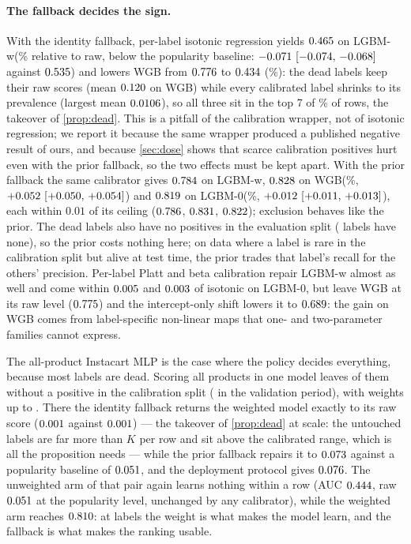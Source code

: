\documentclass[sigconf,nonacm]{acmart}
\newcommand{\Sm}{\textsf{LGBM-w}\xspace}
\newcommand{\Wm}{\textsf{WGB}\xspace}
\newcommand{\Nm}{\textsf{LGBM-0}\xspace}
\begin{document}
\paragraph{The fallback decides the sign.} With the identity fallback, per-label isotonic regression yields $0.465$ on \Sm (\nSplIsoIdRel\% relative to raw, below the popularity baseline: $-0.071~[-0.074,\,-0.068]$ against $0.535$) and lowers \Wm from $0.776$ to $0.434$ (\nWplIsoIdRel\%): the \nSnDead{} dead labels keep their raw scores (mean $0.120$ on \Wm) while every calibrated label shrinks to its prevalence (largest mean $0.0106$), so all three sit in the top 7 of \nWdeadAllRowsPct\% of rows, the takeover of \cref{prop:dead}. This is a pitfall of the calibration wrapper, not of isotonic regression; we report it because the same wrapper produced a published negative result of ours, and because \cref{sec:dose} shows that scarce calibration positives hurt even with the prior fallback, so the two effects must be kept apart. With the prior fallback the same calibrator gives $0.784$ on \Sm, $0.828$ on \Wm (\nWplIsoPriorRel\%, $+0.052~[+0.050,\,+0.054]$) and $0.819$ on \Nm (\nNplIsoPriorRel\%, $+0.012~[+0.011,\,+0.013]$), each within $0.01$ of its ceiling ($0.786$, $0.831$, $0.822$); exclusion behaves like the prior. The \nSnDead{} dead labels also have no positives in the evaluation split (\nnDeadTest{} labels have none), so the prior costs nothing here; on data where a label is rare in the calibration split but alive at test time, the prior trades that label's recall for the others' precision. Per-label Platt and beta calibration repair \Sm almost as well and come within $0.005$ and $0.003$ of isotonic on \Nm, but leave \Wm at its raw level ($0.775$) and the intercept-only shift lowers it to $0.689$: the gain on \Wm comes from label-specific non-linear maps that one- and two-parameter families cannot express.

The all-product Instacart MLP is the case where the policy decides everything, because most labels are dead. Scoring all \nIMAnLabels{} products in one model leaves \nIMASnDead{} of them without a positive in the calibration split (\nIMASnDeadVal{} in the validation period), with weights up to \nIMAwMax. There the identity fallback returns the weighted model exactly to its raw score ($0.001$ against $0.001$) --- the takeover of \cref{prop:dead} at scale: the untouched labels are far more than $K$ per row and sit above the calibrated range, which is all the proposition needs --- while the prior fallback repairs it to $0.073$ against a popularity baseline of $0.051$, and the deployment protocol gives $0.076$. The unweighted arm of that pair again learns nothing within a row (AUC $0.444$, raw $0.051$ at the popularity level, unchanged by any calibrator), while the weighted arm reaches $0.810$: at \nIMAnLabels{} labels the weight is what makes the model learn, and the fallback is what makes the ranking usable.
\end{document}
